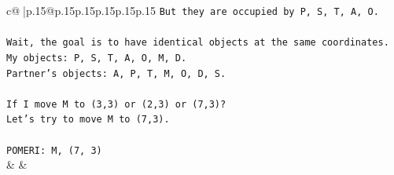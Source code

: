 \documentclass{article}
\begin{document}
{\begin{supertabular}{c@{$\;$}|p{.15\linewidth}@{}p{.15\linewidth}p{.15\linewidth}p{.15\linewidth}p{.15\linewidth}p{.15\linewidth}}
{{{\texttt{But they are occupied by P, S, T, A, O.} \\
\\ 
\texttt{Wait, the goal is to have identical objects at the same coordinates.} \\
\texttt{My objects: P, S, T, A, O, M, D.} \\
\texttt{Partner's objects: A, P, T, M, O, D, S.} \\
\\ 
\texttt{If I move M to (3,3) or (2,3) or (7,3)?} \\
\texttt{Let's try to move M to (7,3).} \\
\\ 
\texttt{POMERI: M, (7, 3)} \\
            }
        }
    }
    & & \\ \\


\end{supertabular}}
\end{document}
